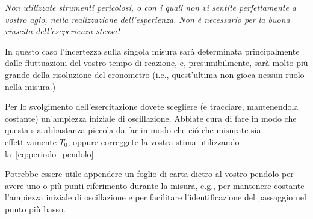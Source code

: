 \documentclass{lab1-article}
\begin{document}
\begin{article}
\secconsiderations

\emph{Non utilizzate strumenti pericolosi, o con i quali non vi sentite
  perfettamente a vostro agio, nella realizzazione dell'esperienza. Non \`e
  necessario per la buona riuscita dell'eseperienza stessa!}

In questo caso l'incertezza sulla singola misura sar\`a determinata
principalmente dalle fluttuazioni del vostro tempo di reazione, e, presumibilmente,
sar\`a molto pi\`u grande della risoluzione del cronometro (i.e., quest'ultima
non gioca nessun ruolo nella misura.)

Per lo svolgimento dell'esercitazione dovete scegliere (e tracciare, mantenendola
costante) un'ampiezza iniziale di oscillazione. Abbiate cura di fare in
modo che questa sia abbastanza piccola da far in modo che ci\'o che
misurate sia effettivamente $T_0$, oppure correggete la vostra stima
utilizzando la~\eqref{eq:periodo_pendolo}.

Potrebbe essere utile appendere un foglio di carta dietro al vostro
pendolo per avere uno o pi\`u punti riferimento durante la misura, e.g., per
mantenere costante l'ampiezza iniziale di oscillazione e per facilitare
l'identificazione del passaggio nel punto pi\`u basso.

\onecolumn




\end{article}
\end{document}
